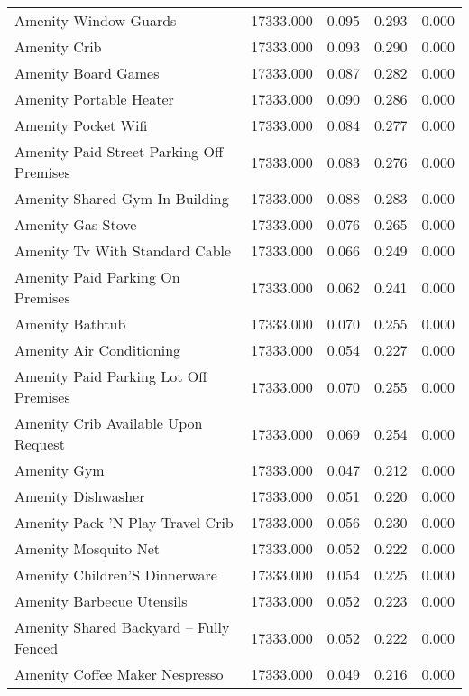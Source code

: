 \begin{tabular}{lllll}
Amenity Window Guards & 17333.000 & 0.095 & 0.293 & 0.000 \\
Amenity Crib & 17333.000 & 0.093 & 0.290 & 0.000 \\
Amenity Board Games & 17333.000 & 0.087 & 0.282 & 0.000 \\
Amenity Portable Heater & 17333.000 & 0.090 & 0.286 & 0.000 \\
Amenity Pocket Wifi & 17333.000 & 0.084 & 0.277 & 0.000 \\
Amenity Paid Street Parking Off Premises & 17333.000 & 0.083 & 0.276 & 0.000 \\
Amenity Shared Gym In Building & 17333.000 & 0.088 & 0.283 & 0.000 \\
Amenity Gas Stove & 17333.000 & 0.076 & 0.265 & 0.000 \\
Amenity Tv With Standard Cable & 17333.000 & 0.066 & 0.249 & 0.000 \\
Amenity Paid Parking On Premises & 17333.000 & 0.062 & 0.241 & 0.000 \\
Amenity Bathtub & 17333.000 & 0.070 & 0.255 & 0.000 \\
Amenity Air Conditioning & 17333.000 & 0.054 & 0.227 & 0.000 \\
Amenity Paid Parking Lot Off Premises & 17333.000 & 0.070 & 0.255 & 0.000 \\
Amenity Crib   Available Upon Request & 17333.000 & 0.069 & 0.254 & 0.000 \\
Amenity Gym & 17333.000 & 0.047 & 0.212 & 0.000 \\
Amenity Dishwasher & 17333.000 & 0.051 & 0.220 & 0.000 \\
Amenity Pack ’N Play Travel Crib & 17333.000 & 0.056 & 0.230 & 0.000 \\
Amenity Mosquito Net & 17333.000 & 0.052 & 0.222 & 0.000 \\
Amenity Children’S Dinnerware & 17333.000 & 0.054 & 0.225 & 0.000 \\
Amenity Barbecue Utensils & 17333.000 & 0.052 & 0.223 & 0.000 \\
Amenity Shared Backyard – Fully Fenced & 17333.000 & 0.052 & 0.222 & 0.000 \\
Amenity Coffee Maker Nespresso & 17333.000 & 0.049 & 0.216 & 0.000 \\
\bottomrule
\end{tabular}
